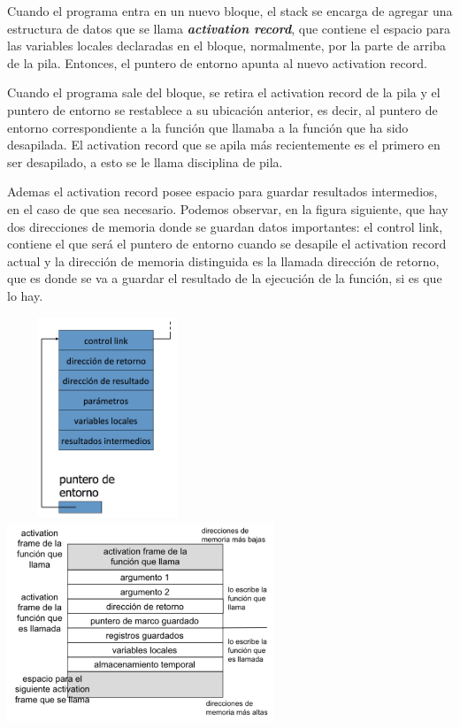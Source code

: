 \documentclass[10pt,a4paper]{report}
\begin{document}
\par Cuando el programa entra en un nuevo bloque, el stack se encarga de agregar una estructura de datos que se llama \textbf{\textit{activation record}}, que contiene el espacio para las variables locales declaradas en el bloque, normalmente, por la parte de arriba de la pila. Entonces, el puntero de entorno apunta al nuevo activation record.

\par Cuando el programa sale del bloque, se retira el activation record de la pila y el puntero de entorno se restablece a su ubicación anterior, es decir, al puntero de entorno correspondiente a la función que llamaba a la función que ha sido desapilada. El activation record que se apila más recientemente es el primero en ser desapilado, a esto se le llama disciplina de pila.

\par Ademas el activation record posee espacio para guardar resultados intermedios, en el caso de que sea necesario. Podemos observar, en la figura siguiente, que hay dos direcciones de memoria donde se guardan datos importantes: el control link, contiene el que será el puntero de entorno cuando se desapile el activation record actual y la dirección de memoria distinguida es la llamada dirección de retorno, que es donde se va a guardar el resultado de la ejecución de la función, si es que lo hay.

\begin{center} 
		\includegraphics[width=6cm, height=6cm]{funcion.png}		
		\includegraphics[width=8cm, height=6cm]{memoria.png}
\end{center}
\end{document}
